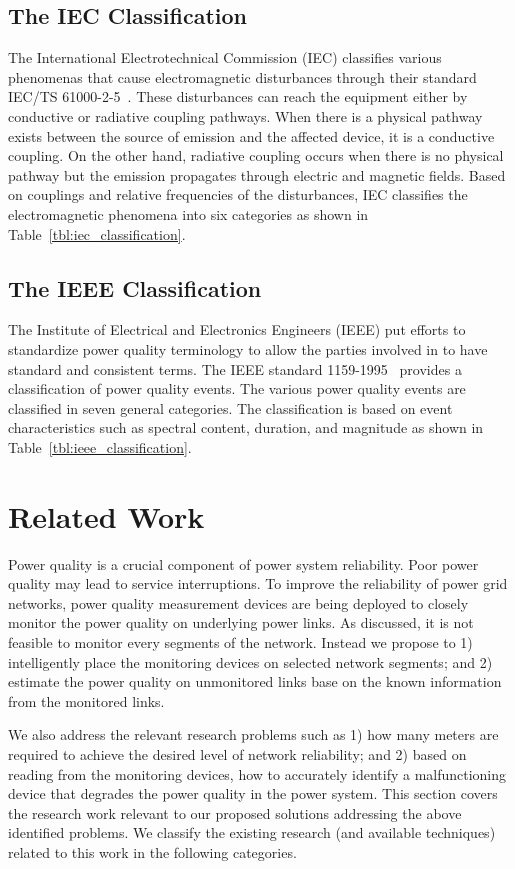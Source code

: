 \subsection{The IEC Classification}
The International Electrotechnical Commission (IEC) classifies various phenomenas that cause electromagnetic disturbances through their standard IEC/TS 61000-2-5~\cite{iec_61000}. These disturbances can reach the equipment either by conductive or radiative coupling pathways. When there is a physical pathway exists between the source of emission and the affected device, it is a conductive coupling. On the other hand, radiative coupling occurs when there is no physical pathway but the emission propagates through electric and magnetic fields. Based on couplings and relative frequencies of the disturbances, IEC classifies the electromagnetic phenomena into six categories as shown in Table~\ref{tbl:iec_classification}.

\subsection{The IEEE Classification}
The Institute of Electrical and Electronics Engineers (IEEE) put efforts to standardize power quality terminology to allow the parties involved in to have standard and consistent terms. The IEEE standard 1159-1995~\cite{IEEE09_1159} provides a classification of power quality events. The various power quality events are classified in seven general categories. The classification is based on event characteristics such as spectral content, duration, and magnitude as shown in Table~\ref{tbl:ieee_classification}.

\section{Related Work}
Power quality is a crucial component of power system reliability. Poor power quality may lead to service interruptions. To improve the reliability of power grid networks, power quality measurement devices are being deployed to closely monitor the  power quality on underlying power links. As discussed, it is not feasible to monitor every segments of the network. Instead we propose to 1) intelligently place the monitoring devices on selected network segments; and 2) estimate the power quality on unmonitored links base on the known information from the monitored links.

We also address the relevant research problems such as 1) how many meters are required to achieve the desired level of network reliability; and 2) based on reading from the monitoring devices, how to accurately identify a malfunctioning device that degrades the power quality in the power system. This section covers the research work relevant to our proposed solutions addressing the above identified problems. We classify the existing research (and available techniques) related to this work in the following categories.

